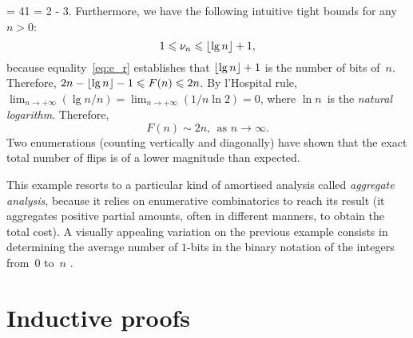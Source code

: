 = 41 = 2  - 3\). Furthermore, we have the following intuitive
tight bounds for any \(n>0\):
\begin{equation*}
1 \leqslant \nu_{n} \leqslant \lfloor{\lg n}\rfloor + 1,
\end{equation*}
because equality~\eqref{eq:e_r} establishes that \(\lfloor{\lg n}\rfloor + 1\)
is the number of bits of~\(n\). Therefore, \(2n - \lfloor{\lg n}\rfloor - 1
\leqslant F(n) \leqslant 2n\). By l'Hospital rule, \(\lim_{n \to
  +\infty}{(\lg n/n)} = \lim_{n \to +\infty}(1/n\ln 2) = 0\), where
\(\ln n\)~is the \emph{natural logarithm}. Therefore,
\begin{equation*}
F(n) \sim 2n,\;\, \text{as \(n \rightarrow \infty\)}.
\end{equation*}
Two enumerations (counting vertically and diagonally) have shown that
the exact total number of flips is of a lower magnitude than expected.

This example resorts to a particular kind of amortised analysis called
\emph{aggregate analysis}, because it relies on enumerative
combinatorics \citep{Stanley_1999a,Stanley_1999b,Martin_2001} to reach
its result (it aggregates positive partial amounts, often in different
manners, to obtain the total cost). A visually appealing variation on
the previous example consists in determining the average number of
\(1\)-bits in the binary notation of the integers from~\(0\) to~\(n\)
\citep{Bush_1940}.

\section{Inductive proofs}

